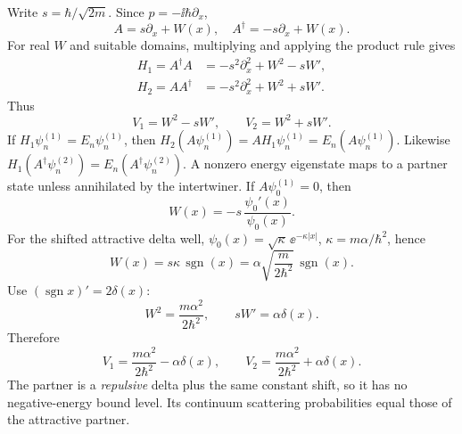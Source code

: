 Write $s=\hbar/\sqrt{2m}$.
Since $p=-\ii\hbar\partial_x$,
\begin{equation}
A=s\partial_x+W(x),\quad
A^\dagger=-s\partial_x+W(x).
\end{equation}
For real $W$ and suitable domains,
multiplying and applying the product rule gives
\begin{align}
H_1=A^\dagger A&=-s^2\partial_x^2+
W^2-sW',\\
H_2=AA^\dagger&=-s^2\partial_x^2+
W^2+sW'.
\end{align}
Thus
\begin{equation}
\boxed{V_1=W^2-sW',\qquad V_2=W^2+sW'}.
\end{equation}
If $H_1\psi_n^{(1)}=E_n\psi_n^{(1)}$,
then
$H_2(A\psi_n^{(1)})=A H_1\psi_n^{(1)}
=E_n(A\psi_n^{(1)})$.
Likewise $H_1(A^\dagger\psi_n^{(2)})
=E_n(A^\dagger\psi_n^{(2)})$.
A nonzero energy eigenstate maps to a
partner state unless annihilated by the
intertwiner. If $A\psi_0^{(1)}=0$, then
\begin{equation}
\boxed{W(x)=-s\,\frac{\psi_0'(x)}{\psi_0(x)}}.
\end{equation}
For the shifted attractive delta well,
$\psi_0(x)=\sqrt\kappa\,\ee^{-\kappa|x|}$,
$\kappa=m\alpha/\hbar^2$, hence
\begin{equation}
W(x)=s\kappa\,\operatorname{sgn}(x)
=\alpha\sqrt{\frac{m}{2\hbar^2}}
\,\operatorname{sgn}(x).
\end{equation}
Use $(\operatorname{sgn}x)'=2\delta(x)$:
\begin{equation}
W^2=\frac{m\alpha^2}{2\hbar^2},\qquad
sW'=\alpha\delta(x).
\end{equation}
Therefore
\begin{equation}
\boxed{V_1=\frac{m\alpha^2}{2\hbar^2}
-\alpha\delta(x),\qquad
V_2=\frac{m\alpha^2}{2\hbar^2}
+\alpha\delta(x)}.
\end{equation}
The partner is a \emph{repulsive} delta
plus the same constant shift, so
it has no negative-energy bound level.
Its continuum scattering probabilities
equal those of the attractive partner.

